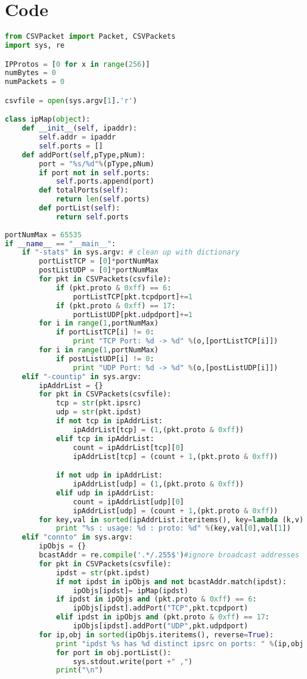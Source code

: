 \documentclass[letterpaper, onecolumn,10pt]{IEEEtran}
\begin{document}
		    
	
\section{Code}
\begin{lstlisting}[language=Python]
from CSVPacket import Packet, CSVPackets
import sys, re

IPProtos = [0 for x in range(256)]
numBytes = 0
numPackets = 0

csvfile = open(sys.argv[1].'r')

class ipMap(object):
    def __init__(self, ipaddr):
        self.addr = ipaddr
        self.ports = []
    def addPort(self,pType,pNum):
        port = "%s/%d"%(pType,pNum)
        if port not in self.ports:
            self.ports.append(port)
        def totalPorts(self):
            return len(self.ports)
        def portList(self):
            return self.ports
        
portNumMax = 65535
if __name__ == "__main__":
    if "-stats" in sys.argv: # clean up with dictionary
        portListTCP = [0]*portNumMax
        postListUDP = [0]*portNumMax
        for pkt in CSVPackets(csvfile):
            if (pkt.proto & 0xff) == 6:
                portListTCP[pkt.tcpdport]+=1
            if (pkt.proto & 0xff) == 17:
                portListUDP[pkt.udpdport]+=1
        for i in range(1,portNumMax)
            if portListTCP[i] != 0:
                print "TCP Port: %d -> %d" %(o,[portListTCP[i]])
        for i in range(1,portNumMax)
            if postListUDP[i] != 0:
                print "UDP Port: %d -> %d" %(o,[postListUDP[i]])
    elif "-countip" in sys.argv:
        ipAddrList = {}
        for pkt in CSVPackets(csvfile):
            tcp = str(pkt.ipsrc)
            udp = str(pkt.ipdst)
            if not tcp in ipAddrList:
                ipAddrList[tcp] = (1,(pkt.proto & 0xff))
            elif tcp in ipAddrList:
                count = ipAddrList[tcp][0]
                ipAddrList[tcp] = (count + 1,(pkt.proto & 0xff))

            if not udp in ipAddrList:
                ipAddrList[udp] = (1,(pkt.proto & 0xff))
            elif udp in ipAddrList:
                count = ipAddrList[udp][0]
                ipAddrList[udp] = (count + 1,(pkt.proto & 0xff))
        for key,val in sorted(ipAddrList.iteritems(), key=lambda (k,v): (v,k), reverse=True):
            print "%s : usage: %d : proto: %d" %(key,val[0],val[1])
    elif "connto" in sys.argv:
        ipObjs = {}
        bcastAddr = re.compile('.*/.255$')#ignore broadcast addresses
        for pkt in CSVPackets(csvfile):
            ipdst = str(pkt.ipdst)
            if not ipdst in ipObjs and not bcastAddr.match(ipdst):
                ipObjs[ipdst]= ipMap(ipdst)
            if ipdst in ipObjs and (pkt.proto & 0xff) == 6:
                ipObjs[ipdst].addPort("TCP",pkt.tcpdport)
            elif ipdst in ipObjs and (pkt.proto & 0xff) == 17:
                ipObjs[ipdst].addPort("UDP",pkt.udpdport)
        for ip,obj in sorted(ipObjs.iteritems(), reverse=True):
            print "ipdst %s has %d distinct ipsrc on ports: " %(ip,obj.totalPorts)
            for port in obj.portList():
                sys.stdout.write(port +" ,")
            print("\n")
                

\end{lstlisting}
\end{document}
